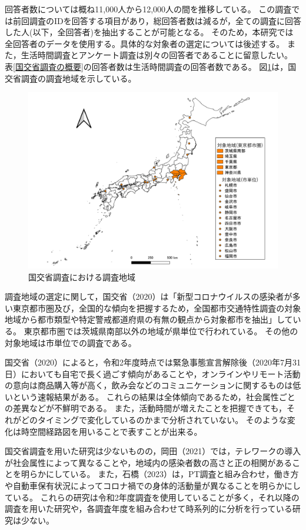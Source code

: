 \documentclass[paper={210mm,297mm},fontsize=15Q,line_length=35zw,number_of_lines=31,head_space=30mm,gutter=40mm,baselineskip=2.0zw,headfoot_verticalposition=1.5zw]{jlreq}
\begin{document}
回答者数については概ね11,000人から12,000人の間を推移している。
この調査では前回調査のIDを回答する項目があり，総回答者数は減るが，全ての調査に回答した人(以下，全回答者)を抽出することが可能となる。
そのため，本研究では全回答者のデータを使用する。具体的な対象者の選定については後述する。
また，生活時間調査とアンケート調査は別々の回答者であることに留意したい。
表\ref{国交省調査の概要}の回答者数は生活時間調査の回答者数である。
図\ref{国交省調査の調査地域}は，国交省調査の調査地域を示している。

\begin{figure}[H]
  \centering
  \includegraphics[width=120mm]{../Figure/c02s01_fig_MLIT-Target-Area-ver3.png}
  \caption{国交省調査における調査地域}
  \label{国交省調査の調査地域}
\end{figure}

調査地域の選定に関して，国交省（2020）は「新型コロナウイルスの感染者が多い東京都市圏及び，全国的な傾向を把握するため，全国都市交通特性調査の対象地域から都市類型や特定警戒都道府県の有無の観点から対象都市を抽出」している。
東京都市圏では茨城県南部以外の地域が県単位で行われている。
その他の対象地域は市単位での調査である。

国交省（2020）によると，令和2年度時点では緊急事態宣言解除後（2020年7月31日）においても自宅で長く過ごす傾向があることや，オンラインやリモート活動の意向は商品購入等が高く，飲み会などのコミュニケーションに関するものは低いという速報結果がある。
これらの結果は全体傾向であるため，社会属性ごとの差異などが不鮮明である。
また，活動時間が増えたことを把握できても，それがどのタイミングで変化しているのかまで分析されていない。
そのような変化は時空間経路図を用いることで表すことが出来る。

国交省調査を用いた研究は少ないものの，岡田（2021）では，テレワークの導入が社会属性によって異なることや，地域内の感染者数の高さと正の相関があることを明らかにしている。
また，石橋（2023）は，PT調査と組み合わせ，働き方や自動車保有状況によってコロナ禍での身体的活動量が異なることを明らかにしている。
これらの研究は令和2年度調査を使用していることが多く，それ以降の調査を用いた研究や，各調査年度を組み合わせて時系列的に分析を行っている研究は少ない。
\end{document}

